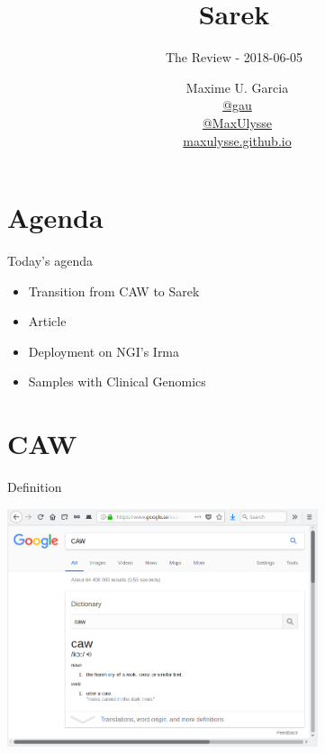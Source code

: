 \documentclass{beamer}
\title{Sarek}
\subtitle{The Review - 2018-06-05}
\author{\vspace{-.6cm}
	\faUser\ Maxime U. Garcia\\
	\faTwitter\ \href{https://twitter.com/gau/}{@gau}\\
	\faGithub\ \href{https://github.com/MaxUlysse/}{@MaxUlysse}\\
	\faGlobe\ \href{https://maxulysse.github.io/}{maxulysse.github.io}
	\vfill
}
\date{\vfill}
\begin{document}
{
	\maketitle
}


\section{Agenda}

\begin{frame}{Today's agenda}
	\begin{itemize}
		\item Transition from CAW to Sarek
		\item Article
		\item Deployment on NGI's Irma
		\item Samples with Clinical Genomics
	\end{itemize}
\end{frame}

\section{CAW}

\begin{frame}{Definition}
	\begin{center}
		\includegraphics[height=7cm]{pictures/Definition.png}
	\end{center}
\end{frame}
\end{document}
